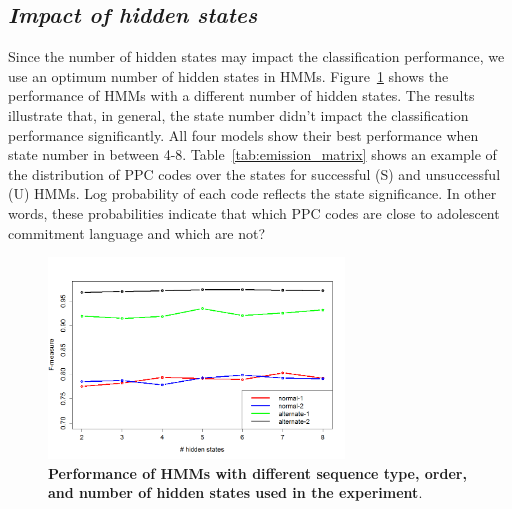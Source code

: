 \documentclass{amia}
\begin{document}
\subsection*{\textit{Impact of hidden states}}
Since the number of hidden states may impact the classification
performance, we use an optimum number of hidden states in HMMs. Figure~\ref{fig:hidden-states} shows the performance of HMMs with a different number of hidden states. The results illustrate that, in general, the state number didn't impact the classification performance significantly. All four models show their best performance when state number in between 4-8. Table~\ref{tab:emission_matrix} shows an example of the distribution of PPC codes over the states for successful (S) and unsuccessful (U) HMMs. Log probability of each code reflects the state significance. In other words, these probabilities indicate that which PPC codes are close to adolescent commitment language and which are not?

\begin{figure}[htb!]
    \centering
    \includegraphics[width=0.70\textwidth]{figures/hidden-states.png}
    \caption{\textbf{Performance of HMMs with different sequence type, order, and number of hidden states used in the experiment}.}
    \label{fig:hidden-states}
\end{figure}
\end{document}
